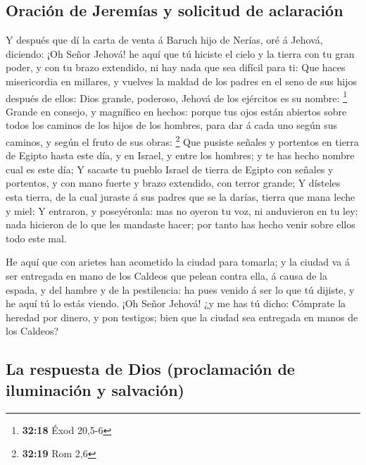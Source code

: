 \hypertarget{oraciuxf3n-de-jeremuxedas-y-solicitud-de-aclaraciuxf3n}{%
\subsection{Oración de Jeremías y solicitud de
aclaración}\label{oraciuxf3n-de-jeremuxedas-y-solicitud-de-aclaraciuxf3n}}

 Y después que dí la carta de venta á Baruch hijo de
Nerías, oré á Jehová, diciendo:  ¡Oh Señor Jehová! he aquí
que tú hiciste el cielo y la tierra con tu gran poder, y con tu brazo
extendido, ni hay nada que sea difícil para ti:  Que haces
misericordia en millares, y vuelves la maldad de los padres en el seno
de sus hijos después de ellos: Dios grande, poderoso, Jehová de los
ejércitos es su nombre: \footnote{\textbf{32:18} Éxod 20,5-6}
 Grande en consejo, y magnífico en hechos: porque tus ojos
están abiertos sobre todos los caminos de los hijos de los hombres, para
dar á cada uno según sus caminos, y según el fruto de sus obras:
\footnote{\textbf{32:19} Rom 2,6}  Que pusiste señales y
portentos en tierra de Egipto hasta este día, y en Israel, y entre los
hombres; y te has hecho nombre cual es este día;  Y sacaste
tu pueblo Israel de tierra de Egipto con señales y portentos, y con mano
fuerte y brazo extendido, con terror grande;  Y dísteles
esta tierra, de la cual juraste á sus padres que se la darías, tierra
que mana leche y miel:  Y entraron, y poseyéronla: mas no
oyeron tu voz, ni anduvieron en tu ley; nada hicieron de lo que les
mandaste hacer; por tanto has hecho venir sobre ellos todo este mal.

 He aquí que con arietes han acometido la ciudad para
tomarla; y la ciudad va á ser entregada en mano de los Caldeos que
pelean contra ella, á causa de la espada, y del hambre y de la
pestilencia: ha pues venido á ser lo que tú dijiste, y he aquí tú lo
estás viendo.  ¡Oh Señor Jehová! ¿y me has tú dicho:
Cómprate la heredad por dinero, y pon testigos; bien que la ciudad sea
entregada en manos de los Caldeos?

\hypertarget{la-respuesta-de-dios-proclamaciuxf3n-de-iluminaciuxf3n-y-salvaciuxf3n}{%
\subsection{La respuesta de Dios (proclamación de iluminación y
salvación)}\label{la-respuesta-de-dios-proclamaciuxf3n-de-iluminaciuxf3n-y-salvaciuxf3n}}

